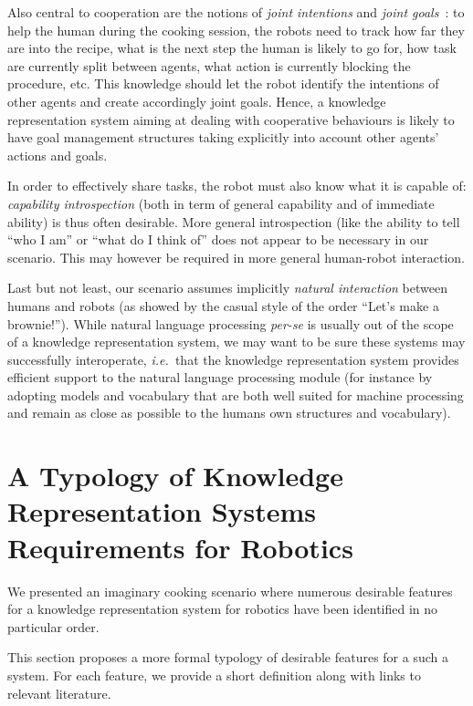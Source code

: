 \documentclass[a4paper, twocolumn]{article}
\newcommand{\ie}{{\textit{i.e.~}}}
\begin{document}
Also central to cooperation are the notions of \emph{joint
intentions} and \emph{joint goals}~\cite{Tomasello2005, Bratman2009}: to help
the human during the cooking session, the robots need to track how far
they are into the recipe, what is the next step the human is likely to go for,
how task are currently split between agents, what action is currently
blocking the procedure, etc. This knowledge should let the robot identify the
intentions of other agents and create accordingly joint goals. Hence, a
knowledge representation system aiming at dealing with cooperative behaviours
is likely to have goal management structures taking explicitly into account
other agents' actions and goals.

In order to effectively share tasks, the robot must also know what it is
capable of: \emph{capability introspection} (both in term of general capability
and of immediate ability) is thus often desirable. More general introspection
(like the ability to tell ``who I am'' or ``what do I think of'' does not
appear to be necessary in our scenario. This may however be required in more
general human-robot interaction.

Last but not least, our scenario assumes implicitly \emph{natural interaction}
between humans and robots (as showed by the casual style of the
order ``Let's make a brownie!''). While natural language processing {\it
per-se} is usually out of the scope of a knowledge representation system, we
may want to be sure these systems may successfully interoperate, \ie that the
knowledge representation system provides efficient support to the natural
language processing module (for instance by adopting models and vocabulary that
are both well suited for machine processing and remain as close as possible to
the humans own structures and vocabulary).

\section{A Typology of Knowledge Representation Systems Requirements for Robotics}
\label{sect|features}

We presented an imaginary cooking scenario where numerous desirable
features for a knowledge representation system for robotics have been
identified in no particular order.

This section proposes a more formal typology of desirable features for a such a
system. For each feature, we provide a short definition along with links to
relevant literature.
\end{document}
